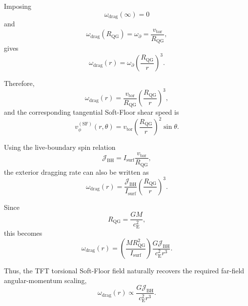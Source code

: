 Imposing
\begin{equation}
    \omega_{\mathrm{drag}}(\infty)=0
\end{equation}
and
\begin{equation}
    \omega_{\mathrm{drag}}(R_{\mathrm{QG}})
    =
    \omega_{\partial}
    =
    \frac{v_{\mathrm{tor}}}{R_{\mathrm{QG}}},
\end{equation}
gives
\begin{equation}
    \omega_{\mathrm{drag}}(r)
    =
    \omega_{\partial}
    \left(
    \frac{R_{\mathrm{QG}}}{r}
    \right)^3 .
\end{equation}

Therefore,
\begin{equation}
    \omega_{\mathrm{drag}}(r)
    =
    \frac{v_{\mathrm{tor}}}{R_{\mathrm{QG}}}
    \left(
    \frac{R_{\mathrm{QG}}}{r}
    \right)^3 ,
\end{equation}
and the corresponding tangential Soft-Floor shear speed is
\begin{equation}
    v_{\phi}^{(\mathrm{SF})}(r,\theta)
    =
    v_{\mathrm{tor}}
    \left(
    \frac{R_{\mathrm{QG}}}{r}
    \right)^2
    \sin\theta .
\end{equation}

Using the live-boundary spin relation
\begin{equation}
    \mathcal{J}_{\mathrm{BH}}
    =
    I_{\mathrm{surf}}
    \frac{v_{\mathrm{tor}}}{R_{\mathrm{QG}}},
\end{equation}
the exterior dragging rate can also be written as
\begin{equation}
    \omega_{\mathrm{drag}}(r)
    =
    \frac{\mathcal{J}_{\mathrm{BH}}}{I_{\mathrm{surf}}}
    \left(
    \frac{R_{\mathrm{QG}}}{r}
    \right)^3 .
\end{equation}

Since
\begin{equation}
    R_{\mathrm{QG}}
    =
    \frac{GM}{c_{\mathrm{E}}^2},
\end{equation}
this becomes
\begin{equation}
    \omega_{\mathrm{drag}}(r)
    =
    \left(
    \frac{M R_{\mathrm{QG}}^2}{I_{\mathrm{surf}}}
    \right)
    \frac{G\mathcal{J}_{\mathrm{BH}}}{c_{\mathrm{E}}^2 r^3}.
\end{equation}

Thus, the TFT torsional Soft-Floor field naturally recovers the required far-field angular-momentum scaling,
\begin{equation}
    \omega_{\mathrm{drag}}(r)
    \propto
    \frac{G\mathcal{J}_{\mathrm{BH}}}{c_{\mathrm{E}}^2 r^3}.
\end{equation}

